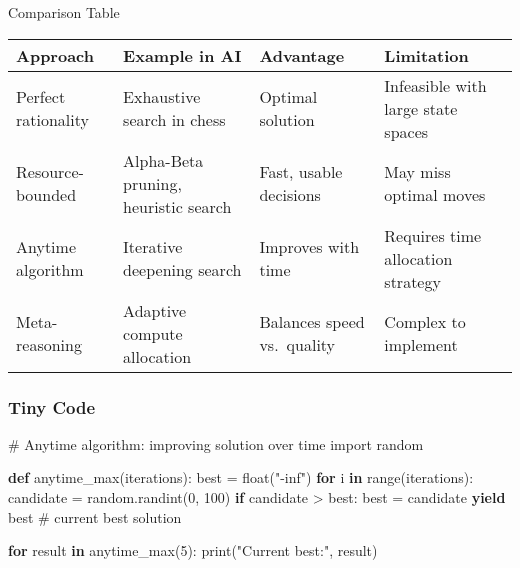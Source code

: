 \documentclass[
  letterpaper,
  DIV=11,
  numbers=noendperiod]{scrreprt}
\newenvironment{Shaded}{\begin{snugshade}}{\end{snugshade}}
\newcommand{\BuiltInTok}[1]{\textcolor[rgb]{0.00,0.23,0.31}{#1}}
\newcommand{\CommentTok}[1]{\textcolor[rgb]{0.37,0.37,0.37}{#1}}
\newcommand{\ControlFlowTok}[1]{\textcolor[rgb]{0.00,0.23,0.31}{\textbf{#1}}}
\newcommand{\DecValTok}[1]{\textcolor[rgb]{0.68,0.00,0.00}{#1}}
\newcommand{\ImportTok}[1]{\textcolor[rgb]{0.00,0.46,0.62}{#1}}
\newcommand{\KeywordTok}[1]{\textcolor[rgb]{0.00,0.23,0.31}{\textbf{#1}}}
\newcommand{\NormalTok}[1]{\textcolor[rgb]{0.00,0.23,0.31}{#1}}
\newcommand{\OperatorTok}[1]{\textcolor[rgb]{0.37,0.37,0.37}{#1}}
\newcommand{\StringTok}[1]{\textcolor[rgb]{0.13,0.47,0.30}{#1}}
\begin{document}
Comparison Table

\begin{longtable}[]{@{}
  >{\raggedright\arraybackslash}p{}
  >{\raggedright\arraybackslash}p{}
  >{\raggedright\arraybackslash}p{}
  >{\raggedright\arraybackslash}p{}@{}}
\toprule\noalign{}
\begin{minipage}[b]{\linewidth}\raggedright
Approach
\end{minipage} & \begin{minipage}[b]{\linewidth}\raggedright
Example in AI
\end{minipage} & \begin{minipage}[b]{\linewidth}\raggedright
Advantage
\end{minipage} & \begin{minipage}[b]{\linewidth}\raggedright
Limitation
\end{minipage} \\
\midrule\noalign{}
\endhead
\bottomrule\noalign{}
\endlastfoot
Perfect rationality & Exhaustive search in chess & Optimal solution &
Infeasible with large state spaces \\
Resource-bounded & Alpha-Beta pruning, heuristic search & Fast, usable
decisions & May miss optimal moves \\
Anytime algorithm & Iterative deepening search & Improves with time &
Requires time allocation strategy \\
Meta-reasoning & Adaptive compute allocation & Balances speed
vs.~quality & Complex to implement \\
\end{longtable}

\subsubsection{Tiny Code}\label{tiny-code-36}

\begin{Shaded}
\begin{Highlighting}[]
\CommentTok{\# Anytime algorithm: improving solution over time}
\ImportTok{import}\NormalTok{ random}

\KeywordTok{def}\NormalTok{ anytime\_max(iterations):}
\NormalTok{    best }\OperatorTok{=} \BuiltInTok{float}\NormalTok{(}\StringTok{"{-}inf"}\NormalTok{)}
    \ControlFlowTok{for}\NormalTok{ i }\KeywordTok{in} \BuiltInTok{range}\NormalTok{(iterations):}
\NormalTok{        candidate }\OperatorTok{=}\NormalTok{ random.randint(}\DecValTok{0}\NormalTok{, }\DecValTok{100}\NormalTok{)}
        \ControlFlowTok{if}\NormalTok{ candidate }\OperatorTok{\textgreater{}}\NormalTok{ best:}
\NormalTok{            best }\OperatorTok{=}\NormalTok{ candidate}
        \ControlFlowTok{yield}\NormalTok{ best  }\CommentTok{\# current best solution}

\ControlFlowTok{for}\NormalTok{ result }\KeywordTok{in}\NormalTok{ anytime\_max(}\DecValTok{5}\NormalTok{):}
    \BuiltInTok{print}\NormalTok{(}\StringTok{"Current best:"}\NormalTok{, result)}
\end{Highlighting}
\end{Shaded}
\end{document}

